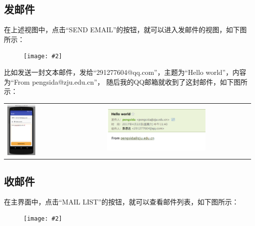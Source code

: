 \documentclass[a4paper,left=2.5cm,right=2.5cm,11pt]{article}
\newcommand{\sizedfic}[2]{\begin{figure}[H]
		\center
		\texttt{[image: \#2]}
	\end{figure}}
\begin{document}
\subsection{发邮件}
	在上述视图中，点击“SEND EMAIL”的按钮，就可以进入发邮件的视图，如下图所示：
	\sizedfic{0.3}{4.png}

	比如发送一封文本邮件，发给“291277604@qq.com”，主题为“Hello world”，内容为“From pengsida@zju.edu.cn”，
	随后我的QQ邮箱就收到了这封邮件，如下图所示：
	\begin{longtable}{p{}p{}}
	\includegraphics[width=0.3\textwidth]{5.png} &
	\includegraphics[width=0.7\textwidth]{6.png} \\
	\end{longtable}

\subsection{收邮件}
	在主界面中，点击“MAIL LIST”的按钮，就可以查看邮件列表，如下图所示：
	\sizedfic{0.3}{7.PNG}
\end{document}
